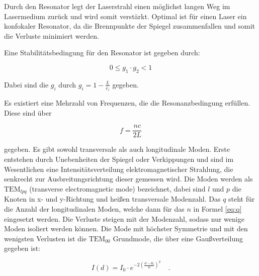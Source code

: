 \noindent Durch den Resonator legt der Laserstrahl einen möglichst langen Weg im Lasermedium zurück und wird somit verstärkt. Optimal ist für einen Laser ein konfokaler Resonator, da die Brennpunkte der Spiegel zusammenfallen und somit die Verluste minimiert werden.

\noindent Eine Stabilitätsbedingung für den Resonator ist gegeben durch:

\begin{equation}
0\le g_1\cdot g_2<1
\end{equation}

\noindent Dabei sind die \(g_i\) durch \(g_i=1-\frac{L}{r_i}\) gegeben.

\noindent Es existiert eine Mehrzahl von Frequenzen, die die Resonanzbedingung erfüllen. Diese sind über 

\begin{equation}
\label{eq:q}
f=\frac{nc}{2L}
\end{equation}

\noindent gegeben. Es gibt sowohl transversale als auch longitudinale Moden. Erste entstehen durch Unebenheiten der Spiegel oder Verkippungen und sind im Wesentlichen eine Intensitätsverteilung elektromagnetischer Strahlung, die senkrecht zur Ausbreitungsrichtung dieser gemessen wird. Die Moden werden als \(\text{TEM}_{lpq}\) (transverse electromagnetic mode) bezeichnet, dabei sind \(l\) und \(p\) die Knoten in x- und y-Richtung und heißen transversale Modenzahl. Das \(q\) steht für die Anzahl der longitudinalen Moden, welche dann für das \(n\) in Formel \ref{eq:q} eingesetzt werden. Die Verluste steigen mit der Modenzahl, sodass nur wenige Moden isoliert werden können. Die Mode mit höchster Symmetrie und mit den wenigsten Verlusten ist die \(\text{TEM}_{00}\) Grundmode, die über eine Gaußverteilung gegeben ist:

\begin{equation}
\label{eq:gauß}
I(d)=I_0\cdot e^{-2\left(\frac{d-d_0}{w}\right)^2}\quad.
\end{equation}